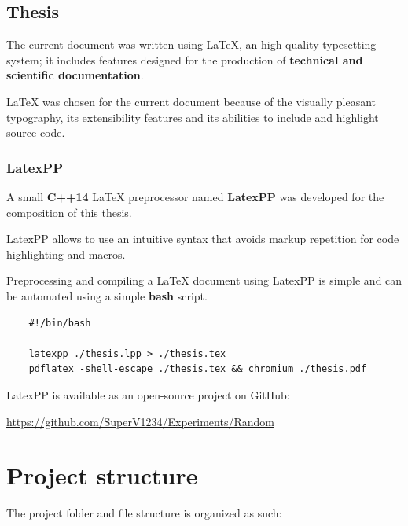 \documentclass[12pt]{report}
\renewcommand\emph{\textbf}
\begin{document}
            \section{Thesis}
                The current document was written using \LaTeX, an high-quality typesetting system; it includes features designed for the production of \emph{technical and scientific documentation}.

                \LaTeX{} was chosen for the current document because of the visually pleasant typography, its extensibility features and its abilities to include and highlight source code.

                \subsection{LatexPP}
                    A small \emph{C++14} \LaTeX{} preprocessor named \emph{LatexPP} was developed for the composition of this thesis.

                    LatexPP allows to use an intuitive syntax that avoids markup repetition for code highlighting and macros.

                    Preprocessing and compiling a \LaTeX{} document using LatexPP is simple and can be automated using a simple \emph{bash} script.

\begin{verbatim}
    #!/bin/bash

    latexpp ./thesis.lpp > ./thesis.tex
    pdflatex -shell-escape ./thesis.tex && chromium ./thesis.pdf
\end{verbatim}

                    LatexPP is available as an open-source project on GitHub:

                    \url{https://github.com/SuperV1234/Experiments/Random}


        \chapter{Project structure}
            The project folder and file structure is organized as such:
\end{document}
